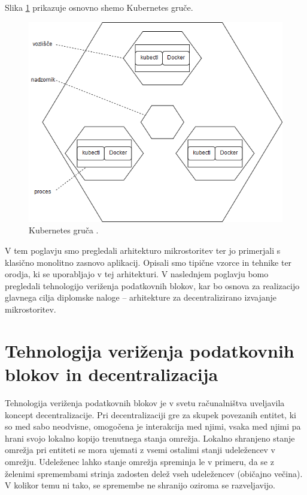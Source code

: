 \documentclass[a4paper, 12pt]{book}
\begin{document}
Slika \ref{kubernetes_cluster} prikazuje osnovno shemo Kubernetes gruče.

\begin{figure}[h]
	\includegraphics[width=1.0\textwidth]{slike/kubernetes_cluster.png}
	\caption{Kubernetes gruča \cite{kubernetesTutorial}.}
	\label{kubernetes_cluster}
\end{figure}

V tem poglavju smo pregledali arhitekturo mikrostoritev ter jo primerjali s klasično monolitno zasnovo aplikacij.
Opisali smo tipične vzorce in tehnike ter orodja, ki se uporabljajo v tej arhitekturi.
V naslednjem poglavju bomo pregledali tehnologijo veriženja podatkovnih blokov, kar bo osnova za realizacijo glavnega cilja diplomske naloge -- arhitekture za decentralizirano izvajanje mikrostoritev.

\chapter{Tehnologija veriženja podatkovnih blokov in decentralizacija}
\label{ch2}

Tehnologija veriženja podatkovnih blokov je v svetu računalništva uveljavila koncept decentralizacije.
Pri decentralizaciji gre za skupek povezanih entitet, ki so med sabo neodvisne, omogočena je interakcija med njimi, vsaka med njimi pa hrani svojo lokalno kopijo trenutnega stanja omrežja.
Lokalno shranjeno stanje omrežja pri entiteti se mora ujemati z vsemi ostalimi stanji udeležencev v omrežju.
Udeleženec lahko stanje omrežja spreminja le v primeru, da se z želenimi spremembami strinja zadosten delež vseh udeležencev (običajno večina).
V kolikor temu ni tako, se spremembe ne shranijo oziroma se razveljavijo.
\end{document}
